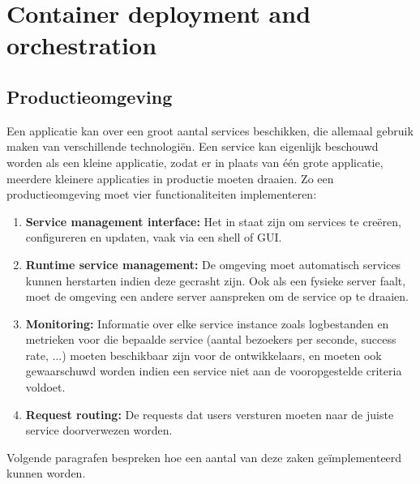 \part{Container deployment and orchestration}
	\chapter{Productieomgeving}
	Een applicatie kan over een groot aantal services beschikken, die allemaal gebruik maken van verschillende technologiën. Een service kan eigenlijk beschouwd worden als een kleine applicatie, zodat er in plaats van één grote applicatie, meerdere kleinere applicaties in productie moeten draaien. Zo een productieomgeving moet vier functionaliteiten implementeren:
	\begin{enumerate}
		\item \textbf{Service management interface:} Het in staat zijn om services te creëren, configureren en updaten, vaak via een shell of GUI.
		\item \textbf{Runtime service management:} De omgeving moet automatisch services kunnen herstarten indien deze gecrasht zijn. Ook als een fysieke server faalt, moet de omgeving een andere server aanspreken om de service op te draaien.
		\item \textbf{Monitoring:} Informatie over elke service instance zoals logbestanden en metrieken voor die bepaalde service (aantal bezoekers per seconde, success rate, ...) moeten beschikbaar zijn voor de ontwikkelaars, en moeten ook gewaarschuwd worden indien een service niet aan de vooropgestelde criteria voldoet.  
		\item \textbf{Request routing:} De requests dat users versturen moeten naar de juiste service doorverwezen worden.
	\end{enumerate}
	Volgende paragrafen bespreken hoe een aantal van deze zaken geïmplementeerd kunnen worden.

